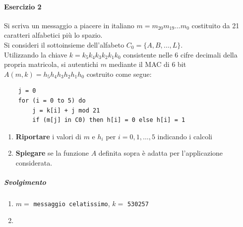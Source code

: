 \documentclass[10pt]{book}
\begin{document}
\paragraph{Esercizio 2} Si scriva un messaggio a piacere in italiano $m = m_{20}m_{19}\ldots m_0$ costituito da 21 caratteri alfabetici più lo spazio.\\
Si consideri il sottoinsieme dell'alfabeto $C_0 = \{A,B,\ldots,L\}$.\\
Utilizzando la chiave $k = k_5k_4k_3k_2k_1k_0$ consistente nelle 6 cifre decimali della propria matricola, si autentichi $m$ mediante il MAC di 6 bit $A(m,k) = h_5h_4h_3h_2h_1h_0$ costruito come segue:
\begin{lstlisting}
	j = 0
	for (i = 0 to 5) do
		j = k[i] + j mod 21
		if (m[j] in C0) then h[i] = 0 else h[i] = 1
\end{lstlisting}
\begin{enumerate}
	\item \textbf{Riportare} i valori di $m$ e $h_i$ per $i = 0,1,\ldots,5$ indicando i calcoli
	\item \textbf{Spiegare} se la funzione $A$ definita sopra è adatta per l'applicazione considerata.
\end{enumerate}
\subparagraph{Svolgimento} \begin{enumerate}
\item $m =$ \texttt{messaggio celatissimo}, $k =$ \texttt{530257}
\item
\end{enumerate}
\pagebreak
\end{document}
